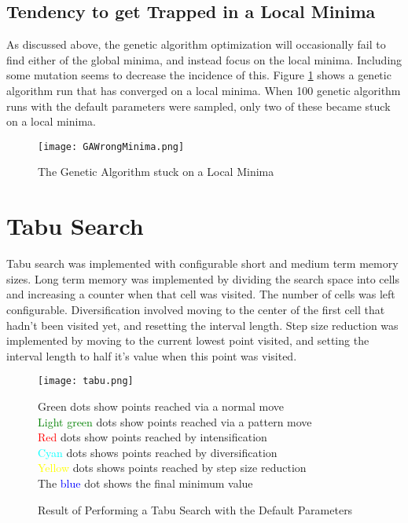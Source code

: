 \documentclass[a4paper,12pt]{article}
\begin{document}
\subsection{Tendency to get Trapped in a Local Minima}

As discussed above, the genetic algorithm optimization will occasionally fail to find either of the global minima, and instead focus on the local minima.
Including some mutation seems to decrease the incidence of this. 
Figure \ref{fig:GALocalMinima} shows a genetic algorithm run that has converged on a local minima.
When 100 genetic algorithm runs with the default parameters were sampled, only two of these became stuck on a local minima.


\begin{figure}[H]
 \centering
 \texttt{[image: GAWrongMinima.png]}
 \caption{The Genetic Algorithm stuck on a Local Minima}
 \label{fig:GALocalMinima}
\end{figure}


\section{Tabu Search}

Tabu search was implemented with configurable short and medium term memory sizes.
Long term memory was implemented by dividing the search space into cells and increasing a counter when  that cell was visited.
The number of cells was left configurable.
Diversification involved moving to the center of the first cell that hadn't been visited yet, and resetting the interval length.
Step size reduction was implemented by moving to the current lowest point visited, and setting the interval length to half it's value when this point was visited. 

\begin{figure}[H]
 \centering
 \texttt{[image: tabu.png]}
 \caption{Result of Performing a Tabu Search with the Default Parameters}
 \textcolor{OliveGreen}{Green} dots show points reached via a normal move\\
 \textcolor{green}{Light green} dots show points reached via a pattern move\\
 \textcolor{red}{Red} dots show points reached by intensification\\
 \textcolor{cyan}{Cyan} dots shows points reached by diversification\\
 \textcolor{yellow}{Yellow} dots shows points reached by step size reduction\\   
 The \textcolor{blue}{blue} dot shows the final minimum value\\ 
 \label{fig:tabu}  
\end{figure}
\end{document}
